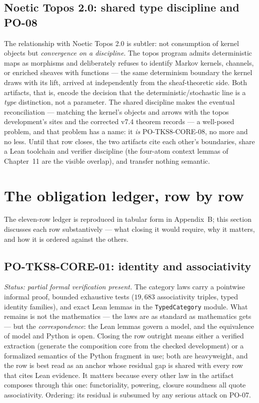 \subsection{Noetic Topos 2.0: shared type discipline and PO-08}\label{ch12:sec:nt2}

The relationship with Noetic Topos 2.0 is subtler: not consumption of
kernel objects but \emph{convergence on a discipline}. The topos
program admits deterministic maps as morphisms and deliberately
refuses to identify Markov kernels, channels, or enriched sheaves
with functions --- the same determinism boundary the kernel draws
with its lift, arrived at independently from the sheaf-theoretic
side. Both artifacts, that is, encode the decision that the
deterministic/stochastic line is a \emph{type} distinction, not a
parameter. The shared discipline makes the eventual reconciliation
--- matching the kernel's objects and arrows with the topos
development's sites and the corrected v7.4 theorem records --- a
well-posed problem, and that problem has a name: it \emph{is}
PO-TKS8-CORE-08, no more and no less. Until that row closes, the two
artifacts cite each other's boundaries, share a Lean toolchain and
verifier discipline (the four-atom context lemmas of Chapter~11 are
the visible overlap), and transfer nothing semantic.

\section{The obligation ledger, row by row}\label{ch12:sec:ledger}

The eleven-row ledger is reproduced in tabular form in Appendix~B; this
section discusses each row substantively --- what closing it would
require, why it matters, and how it is ordered against the others.

\subsection{PO-TKS8-CORE-01: identity and associativity}

\emph{Status: partial formal verification present.} The category laws
carry a pointwise informal proof, bounded exhaustive tests ($19{,}683$
associativity triples, typed identity families), and exact Lean lemmas
in the \texttt{TypedCategory} module. What remains is not the
mathematics --- the laws are as standard as mathematics gets --- but
the \emph{correspondence}: the Lean lemmas govern a model, and the
equivalence of model and Python is open. Closing the row outright
means either a verified extraction (generate the composition core from
the checked development) or a formalized semantics of the Python
fragment in use; both are heavyweight, and the row is best read as an
anchor whose residual gap is shared with every row that cites Lean
evidence. It matters because every other law in the artifact composes
through this one: functoriality, powering, closure soundness all quote
associativity. Ordering: its residual is subsumed by any serious
attack on PO-07.

